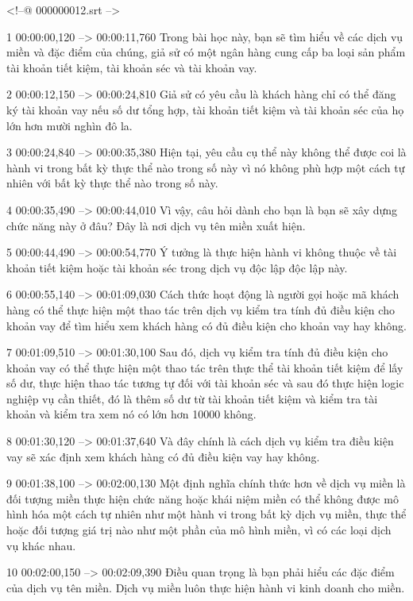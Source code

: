 <!--@ 000000012.srt -->

1
00:00:00,120 --> 00:00:11,760
Trong bài học này, bạn sẽ tìm hiểu về các dịch vụ miền và đặc điểm của chúng, giả sử có một ngân hàng cung cấp ba loại sản phẩm tài khoản tiết kiệm, tài khoản séc và tài khoản vay.

2
00:00:12,150 --> 00:00:24,810
Giả sử có yêu cầu là khách hàng chỉ có thể đăng ký tài khoản vay nếu số dư tổng hợp, tài khoản tiết kiệm và tài khoản séc của họ lớn hơn mười nghìn đô la.

3
00:00:24,840 --> 00:00:35,380
Hiện tại, yêu cầu cụ thể này không thể được coi là hành vi trong bất kỳ thực thể nào trong số này vì nó không phù hợp một cách tự nhiên với bất kỳ thực thể nào trong số này.

4
00:00:35,490 --> 00:00:44,010
Vì vậy, câu hỏi dành cho bạn là bạn sẽ xây dựng chức năng này ở đâu?  Đây là nơi dịch vụ tên miền xuất hiện.

5
00:00:44,490 --> 00:00:54,770
Ý tưởng là thực hiện hành vi không thuộc về tài khoản tiết kiệm hoặc tài khoản séc trong dịch vụ độc lập độc lập này.

6
00:00:55,140 --> 00:01:09,030
Cách thức hoạt động là người gọi hoặc mã khách hàng có thể thực hiện một thao tác trên dịch vụ kiểm tra tính đủ điều kiện cho khoản vay để tìm hiểu xem khách hàng có đủ điều kiện cho khoản vay hay không.

7
00:01:09,510 --> 00:01:30,100
Sau đó, dịch vụ kiểm tra tính đủ điều kiện cho khoản vay có thể thực hiện một thao tác trên thực thể tài khoản tiết kiệm để lấy số dư, thực hiện thao tác tương tự đối với tài khoản séc và sau đó thực hiện logic nghiệp vụ cần thiết, đó là thêm số dư từ tài khoản tiết kiệm và  kiểm tra tài khoản và kiểm tra xem nó có lớn hơn 10000 không.

8
00:01:30,120 --> 00:01:37,640
Và đây chính là cách dịch vụ kiểm tra điều kiện vay sẽ xác định xem khách hàng có đủ điều kiện vay hay không.

9
00:01:38,100 --> 00:02:00,130
Một định nghĩa chính thức hơn về dịch vụ miền là đối tượng miền thực hiện chức năng hoặc khái niệm miền có thể không được mô hình hóa một cách tự nhiên như một hành vi trong bất kỳ dịch vụ miền, thực thể hoặc đối tượng giá trị nào như một phần của mô hình miền, vì có  các loại dịch vụ khác nhau.

10
00:02:00,150 --> 00:02:09,390
Điều quan trọng là bạn phải hiểu các đặc điểm của dịch vụ tên miền.  Dịch vụ miền luôn thực hiện hành vi kinh doanh cho miền.

